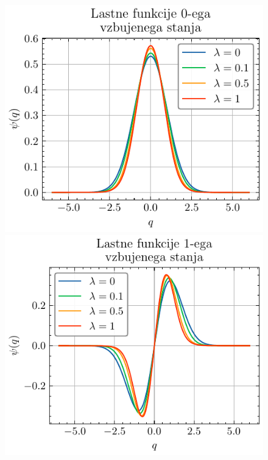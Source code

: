 \documentclass[slovene,11pt,a4paper]{article}
\begin{document}
\begin{figure}[ht]
  \centering
  \begin{minipage}{0.48\textwidth}
    \centering
    \includegraphics[width=\linewidth]{graphs/eig0.pdf}
    
  \end{minipage}%
  \hfill%
  \begin{minipage}{0.48\textwidth}
    \centering
    \includegraphics[width=\linewidth]{graphs/eig1.pdf}
    

\end{minipage}
\end{figure}
\end{document}

